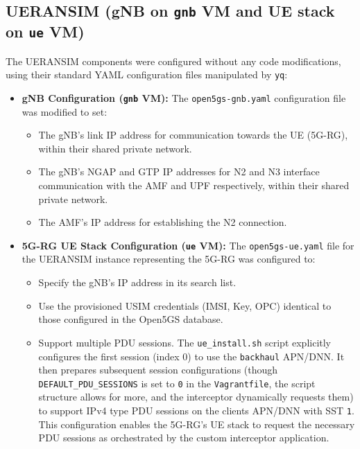 \subsection{UERANSIM (\ac{gNB} on \texttt{gnb} \ac{VM} and \ac{UE} stack on \texttt{ue} \ac{VM})}

The UERANSIM components were configured without any code modifications, using their standard YAML configuration files manipulated by \texttt{yq}:

\begin{itemize}
    \item{
        \textbf{\ac{gNB} Configuration (\texttt{gnb} \ac{VM}):} The \texttt{open5gs-gnb.yaml} configuration file was modified to set:
        \begin{itemize}
            \item The \ac{gNB}'s link \ac{IP} address for communication towards the \ac{UE} (\ac{5G-RG}), within their shared private network.

            \item The \ac{gNB}'s \ac{NGAP} and \ac{GTP} \ac{IP} addresses for N2 and N3 interface communication with the \ac{AMF} and \ac{UPF} respectively, within their shared private network.

            \item The \ac{AMF}'s \ac{IP} address for establishing the N2 connection.
        \end{itemize}
    }
    \item{
        \textbf{\ac{5G-RG} \ac{UE} Stack Configuration (\texttt{ue} \ac{VM}):} The \texttt{open5gs-ue.yaml} file for the UERANSIM instance representing the \ac{5G-RG} was configured to:
        \begin{itemize}
            \item Specify the \ac{gNB}'s \ac{IP} address in its search list.

            \item Use the provisioned \ac{USIM} credentials (\ac{IMSI}, Key, \ac{OPC}) identical to those configured in the Open5GS database.

            \item Support multiple \ac{PDU} sessions. The \texttt{ue\_install.sh} script explicitly configures the first session (index 0) to use the \texttt{backhaul} \ac{APN}/\ac{DNN}. It then prepares subsequent session configurations (though \texttt{DEFAULT\_PDU\_SESSIONS} is set to \texttt{0} in the \texttt{Vagrantfile}, the script structure allows for more, and the interceptor dynamically requests them) to support \ac{IPv4} type \ac{PDU} sessions on the clients \ac{APN}/\ac{DNN} with \ac{SST} \texttt{1}. This configuration enables the \ac{5G-RG}'s \ac{UE} stack to request the necessary \ac{PDU} sessions as orchestrated by the custom interceptor application.
        \end{itemize}
    }
\end{itemize}


